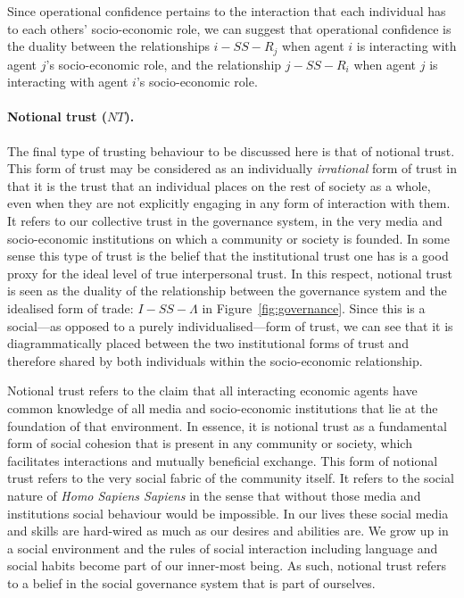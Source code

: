 \begin{subappendices}
Since operational confidence pertains to the interaction that each individual has to each others' socio-economic role, we can suggest that operational confidence is the duality between the relationships $i-SS-R_{j}$ when agent $i$ is interacting with agent $j$'s socio-economic role, and the relationship $j-SS-R_{i}$ when agent $j$ is interacting with agent $i$'s socio-economic role.

\paragraph{Notional trust ($NT$).}

The final type of trusting behaviour to be discussed here is that of notional trust. This form of trust may be considered as an individually \textit{irrational} form of trust in that it is the trust that an individual places on the rest of society as a whole, even when they are not explicitly engaging in any form of interaction with them. It refers to our collective trust in the governance system, in the very media and socio-economic institutions on which a community or society is founded. In some sense this type of trust is the belief that the institutional trust one has is a good proxy for the ideal level of true interpersonal trust. In this respect, notional trust is seen as the duality of the relationship between the governance system and the idealised form of trade: $I-SS-\Lambda$ in Figure~\ref{fig:governance}. Since this is a social---as opposed to a purely individualised---form of trust, we can see that it is diagrammatically placed between the two institutional forms of trust and therefore shared by both individuals within the socio-economic relationship.

Notional trust refers to the claim that all interacting economic agents have common knowledge of all media and socio-economic institutions that lie at the foundation of that environment. In essence, it is notional trust as a fundamental form of social cohesion that is present in any community or society, which facilitates interactions and mutually beneficial exchange. This form of notional trust refers to the very social fabric of the community itself. It refers to the social nature of \textit{Homo Sapiens Sapiens} in the sense that without those media and institutions social behaviour would be impossible. In our lives these social media and skills are hard-wired as much as our desires and abilities are. We grow up in a social environment and the rules of social interaction including language and social habits become part of our inner-most being. As such, notional trust refers to a belief in the social governance system that is part of ourselves.


\end{subappendices}
